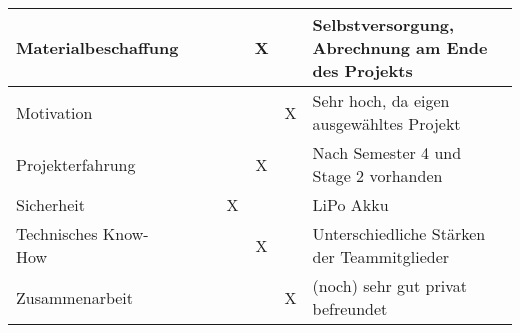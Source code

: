 \begin{table}[H]
{\begin{tabular}{|l|c|c|c|c|c|l|}
    Materialbeschaffung    &             &            &            & X          &             & Selbstversorgung,   Abrechnung am Ende des Projekts \\ \hline
    Motivation             &             &            &            &            & X           & Sehr hoch, da eigen   ausgewähltes Projekt          \\ \hline
    Projekterfahrung       &             &            &            & X          &             & Nach Semester 4 und Stage   2 vorhanden             \\ \hline
    Sicherheit             &             &            & X          &            &             & LiPo Akku                                           \\ \hline
    Technisches Know-How   &             &            &            & X          &             & Unterschiedliche Stärken   der Teammitglieder       \\ \hline
    Zusammenarbeit         &             &            &            &            & X           & (noch) sehr gut privat   befreundet                 \\ \hline
    \end{tabular}%
    }
    \label{tab:my-table}
    \end{table}
